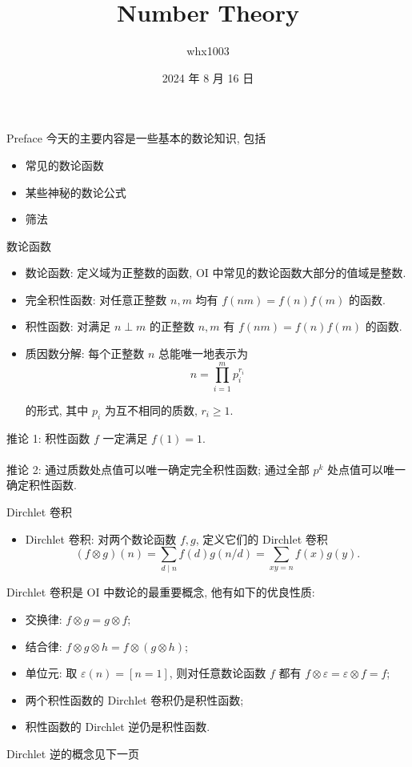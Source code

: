 \documentclass{beamer}
\title{Number Theory}
\author{whx1003}
\date{2024 年 8 月 16 日}
\newcommand{\nl}{\\\hspace*{\fill}\\}
\begin{document}
    \maketitle

    \begin{frame}{Preface}
        今天的主要内容是一些基本的数论知识, 包括
        \begin{itemize}
            \item 常见的数论函数
            \item 某些神秘的数论公式
            \item 筛法
        \end{itemize}
    \end{frame}

    \begin{frame}{数论函数}
        \begin{itemize}
            \item 数论函数: 定义域为正整数的函数, OI 中常见的数论函数大部分的值域是整数.
            \item 完全积性函数: 对任意正整数 $n,m$ 均有 $f(nm)=f(n)f(m)$ 的函数.
            \item 积性函数: 对满足 $n\perp m$ 的正整数 $n,m$ 有 $f(nm)=f(n)f(m)$ 的函数.
            \item 质因数分解: 每个正整数 $n$ 总能唯一地表示为
            $$
            n=\prod_{i=1}^m p_i^{r_i}
            $$
            
            的形式, 其中 $p_i$ 为互不相同的质数, $r_i\geq 1$.
        \end{itemize}
        推论 1: 积性函数 $f$ 一定满足 $f(1)=1$.\nl
        推论 2: 通过质数处点值可以唯一确定完全积性函数; 通过全部 $p^k$ 处点值可以唯一确定积性函数.
    \end{frame}

    \begin{frame}{Dirchlet 卷积}
        \begin{itemize}
            \item Dirchlet 卷积: 对两个数论函数 $f,g$, 定义它们的 Dirchlet 卷积
            $$
            (f\otimes g)(n)=\sum_{d\mid n}f(d)g(n/d)=\sum_{xy=n}f(x)g(y).
            $$
        \end{itemize}
        Dirchlet 卷积是 OI 中数论的最重要概念, 他有如下的优良性质:
        \begin{itemize}
            \item 交换律: $f\otimes g=g\otimes f$;
            \item 结合律: $f\otimes g\otimes h=f\otimes(g\otimes h)$;
            \item 单位元: 取 $\varepsilon(n)=[n=1]$, 则对任意数论函数 $f$ 都有 $f\otimes\varepsilon=\varepsilon\otimes f=f$;
            \item 两个积性函数的 Dirchlet 卷积仍是积性函数;
            \item 积性函数的 Dirchlet 逆仍是积性函数.
        \end{itemize}
        Dirchlet 逆的概念见下一页
    \end{frame}
\end{document}
